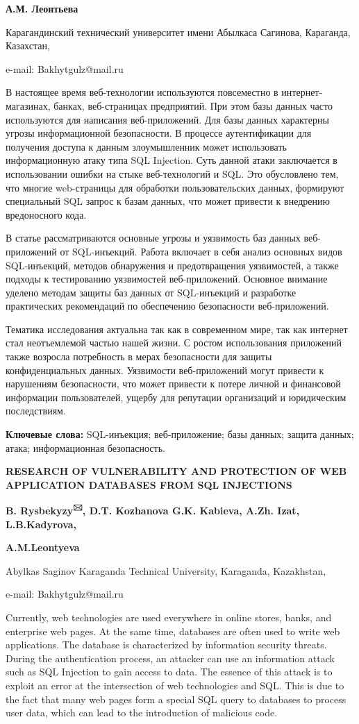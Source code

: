 {\bfseries А.М. Леонтьева}

Карагандинский технический университет имени Абылкаса Сагинова,
Караганда, Казахстан,

e-mail: Bakhytgulz@mail.ru

В настоящее время веб-технологии используются повсеместно в
интернет-магазинах, банках, веб-страницах предприятий. При этом базы
данных часто используются для написания веб-приложений. Для базы данных
характерны угрозы информационной безопасности. В процессе аутентификации
для получения доступа к данным злоумышленник может использовать
информационную атаку типа SQL Injection. Суть данной атаки заключается в
использовании ошибки на стыке веб-технологий и SQL. Это обусловлено тем,
что многие web-страницы для обработки пользовательских данных, формируют
специальный SQL запрос к базам данных, что может привести к внедрению
вредоносного кода.

В статье рассматриваются основные угрозы и уязвимость баз данных
веб-приложений от SQL-инъекций. Работа включает в себя анализ основных
видов SQL-инъекций, методов обнаружения и предотвращения уязвимостей, а
также подходы к тестированию уязвимостей веб-приложений. Основное
внимание уделено методам защиты баз данных от SQL-инъекций и разработке
практических рекомендаций по обеспечению безопасности веб-приложений.

Тематика исследования актуальна так как в современном мире, так как
интернет стал неотъемлемой частью нашей жизни. С ростом использования
приложений также возросла потребность в мерах безопасности для защиты
конфиденциальных данных. Уязвимости веб-приложений могут привести к
нарушениям безопасности, что может привести к потере личной и финансовой
информации пользователей, ущербу для репутации организаций и юридическим
последствиям.

{\bfseries Ключевые слова:} SQL-инъекция; веб-приложение; базы данных;
защита данных; атака; информационная безопасность.

{\bfseries RESEARCH OF VULNERABILITY AND PROTECTION OF WEB APPLICATION
DATABASES FROM SQL INJECTIONS}

{\bfseries B. Rysbekyzy\textsuperscript{🖂}, D.T. Kozhanova G.K. Kabieva,
A.Zh. Izat, L.B.Kadyrova,}

{\bfseries A.M.Leontyeva}

Abylkas Saginov Karaganda Technical University, Karaganda, Kazakhstan,

e-mail: Bakhytgulz@mail.ru

Currently, web technologies are used everywhere in online stores, banks,
and enterprise web pages. At the same time, databases are often used to
write web applications. The database is characterized by information
security threats. During the authentication process, an attacker can use
an information attack such as SQL Injection to gain access to data. The
essence of this attack is to exploit an error at the intersection of web
technologies and SQL. This is due to the fact that many web pages form a
special SQL query to databases to process user data, which can lead to
the introduction of malicious code.


